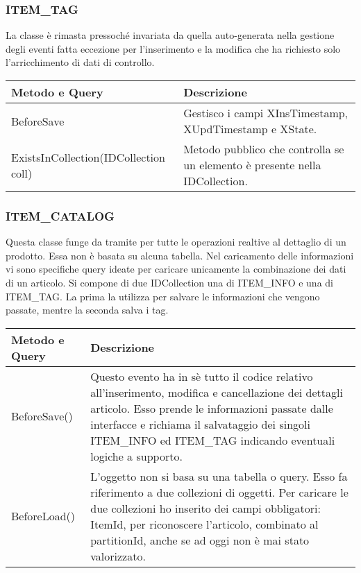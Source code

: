 \subsubsection{ITEM\_TAG}
La classe è rimasta pressoché invariata da quella auto-generata nella gestione degli eventi fatta eccezione per l'inserimento e la modifica che ha richiesto solo l'arricchimento di dati di controllo.

\begin{center}
	\begin{tabular}{ p{3cm}|p{} }
		\hline
		\textbf{Metodo e Query} & \textbf{Descrizione}\\
		\hline
		BeforeSave& Gestisco i campi XInsTimestamp, XUpdTimestamp e XState.\\
		\hline
		ExistsInCollection(IDCollection coll) & Metodo pubblico che controlla se un elemento è presente nella IDCollection.\\
		
	\end{tabular}
\end{center}

\subsubsection{ITEM\_CATALOG}
Questa classe funge da tramite per tutte le operazioni realtive al dettaglio di un prodotto. Essa non è basata su alcuna tabella. Nel caricamento delle informazioni vi sono specifiche query ideate per caricare unicamente la combinazione dei dati di un articolo. Si compone di due IDCollection una di ITEM\_INFO e una di ITEM\_TAG. La prima la utilizza per salvare le informazioni che vengono passate, mentre la seconda salva i tag.

\begin{center}
	\begin{tabular}{ p{3cm}|p{} }
		\hline
		\textbf{Metodo e Query} & \textbf{Descrizione}\\
		\hline
		BeforeSave()& Questo evento ha in sè tutto il codice relativo all'inserimento, modifica e cancellazione dei dettagli articolo. Esso prende le informazioni passate dalle interfacce e richiama il salvataggio dei singoli ITEM\_INFO ed ITEM\_TAG indicando eventuali logiche a supporto.\\
		BeforeLoad()& L'oggetto non si basa su una tabella o query. Esso fa riferimento a due collezioni di oggetti. Per caricare le due collezioni ho inserito dei campi obbligatori: ItemId, per riconoscere l'articolo, combinato al partitionId, anche se ad oggi non è mai stato valorizzato.  \\
		
	\end{tabular}
\end{center}



